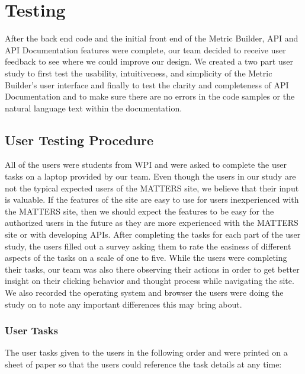 \chapter{Testing}

	After the back end code and the initial front end of the Metric Builder, 
	API and API Documentation features were complete, our team decided to receive 
	user feedback to see where we could improve our design. We created a two part 
	user study to first test the usability, intuitiveness, and simplicity of the 
	Metric Builder's user interface and finally to test the clarity and completeness 
	of API Documentation and to make sure there are no errors in the code samples 
	or the natural language text within the documentation. 

	\section{User Testing Procedure}

		All of the users were students from WPI and were asked to complete the user tasks on a 
		laptop provided by our team. Even though the users in our study are not the typical 
		expected users of the MATTERS site, we believe that their input is valuable. 
		If the features of the site are easy to use for users inexperienced with the MATTERS site, 
		then we should expect the features to be easy for the authorized users in the future as they 
		are more experienced with the MATTERS site or with developing APIs. After completing the tasks 
		for each part of the user study, the users filled out a survey asking them to rate the 
		easiness of different aspects of the tasks on a scale of one to five. While the users were 
		completing their tasks, our team was also there observing their actions in order to get better 
		insight on their clicking behavior and thought process while navigating the site. 
		We also recorded the operating system and browser the users were doing the study on to 
		note any important differences this may bring about.

		\subsection{User Tasks}
		
			The user tasks given to the users in the following order and were printed on a 
			sheet of paper so that the users could reference the task details at any time:
			
